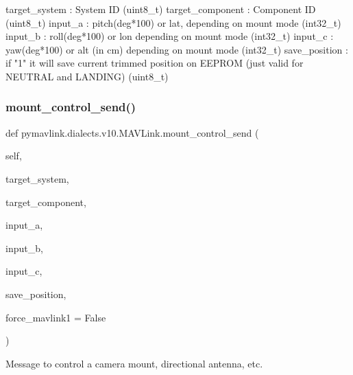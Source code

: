 \begin{DoxyVerb}
\begin{DoxyVerb}
\begin{DoxyVerb}
\begin{DoxyVerb}
\begin{DoxyVerb}
target_system             : System ID (uint8_t)
target_component          : Component ID (uint8_t)
input_a                   : pitch(deg*100) or lat, depending on mount mode (int32_t)
input_b                   : roll(deg*100) or lon depending on mount mode (int32_t)
input_c                   : yaw(deg*100) or alt (in cm) depending on mount mode (int32_t)
save_position             : if "1" it will save current trimmed position on EEPROM (just valid for NEUTRAL and LANDING) (uint8_t)\end{DoxyVerb}
 \mbox{\label{classpymavlink_1_1dialects_1_1v10_1_1MAVLink_a01ea592ecade582e71c283961aa7fe2a}} 
\subsubsection{\texorpdfstring{mount\+\_\+control\+\_\+send()}{mount\_control\_send()}}
{\footnotesize\ttfamily def pymavlink.\+dialects.\+v10.\+M\+A\+V\+Link.\+mount\+\_\+control\+\_\+send (\begin{DoxyParamCaption}\item[{}]{self,  }\item[{}]{target\+\_\+system,  }\item[{}]{target\+\_\+component,  }\item[{}]{input\+\_\+a,  }\item[{}]{input\+\_\+b,  }\item[{}]{input\+\_\+c,  }\item[{}]{save\+\_\+position,  }\item[{}]{force\+\_\+mavlink1 = {\ttfamily False} }\end{DoxyParamCaption})}

\begin{DoxyVerb}Message to control a camera mount, directional antenna, etc.


\end{DoxyVerb}
\end{DoxyVerb}
\end{DoxyVerb}
\end{DoxyVerb}
\end{DoxyVerb}
